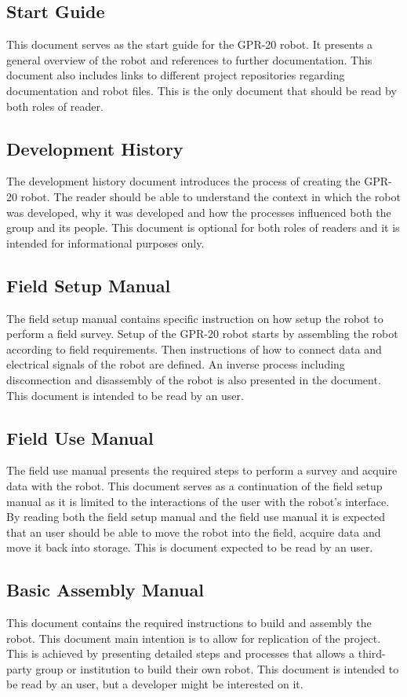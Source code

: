 \documentclass{article}
\begin{document}
\subsection{Start Guide}
This document serves as the start guide for the GPR-20 robot. It presents a general overview of the robot and references to further documentation. This document also includes links to different project repositories regarding documentation and robot files. This is the only document that should be read by both roles of reader. 

\subsection{Development History}
The development history document introduces the process of creating the GPR-20 robot. The reader should be able to understand the context in which the robot was developed, why it was developed and how the processes influenced both the group and its people. This document is optional for both roles of readers and it is intended for informational purposes only.

\subsection{Field Setup Manual}
The field setup manual contains specific instruction on how setup the robot to perform a field survey. Setup of the GPR-20 robot starts by assembling the robot according to field requirements. Then instructions of how to connect data and electrical signals of the robot are defined. An inverse process including disconnection and disassembly of the robot is also presented in the document. This document is intended to be read by an user.

\subsection{Field Use Manual}
The field use manual presents the required steps to perform a survey and acquire data with the robot. This document serves as a continuation of the field setup manual as it is limited to the interactions of the user with the robot's interface. By reading both the field setup manual and the field use manual it is expected that an user should be able to move the robot into the field, acquire data and move it back into storage. This is document expected to be read by an user.

\subsection{Basic Assembly Manual}
This document contains the required instructions to build and assembly the robot. This document main intention is to allow for replication of the project. This is achieved by presenting detailed steps and processes that allows a third-party group or institution to build their own robot. This document is intended to be read by an user, but a developer might be interested on it.
\end{document}
